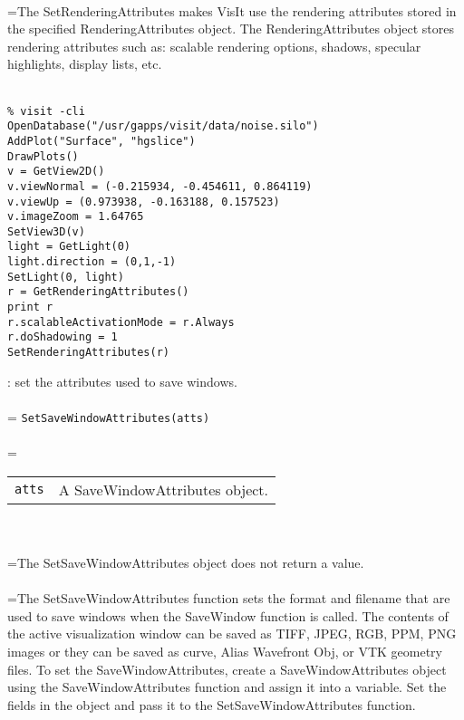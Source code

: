 \documentclass[10pt,a4paper]{report}
\begin{document}
 \\ 
\hangindent=\parindent The SetRenderingAttributes makes VisIt use the rendering attributes stored in the specified RenderingAttributes object. The RenderingAttributes object stores rendering attributes such as: scalable rendering options, shadows, specular highlights, display lists, etc. \\[-3mm] 

\\[-6mm]
\begin{verbatim}% visit -cli
OpenDatabase("/usr/gapps/visit/data/noise.silo")
AddPlot("Surface", "hgslice")
DrawPlots()
v = GetView2D()
v.viewNormal = (-0.215934, -0.454611, 0.864119)
v.viewUp = (0.973938, -0.163188, 0.157523)
v.imageZoom = 1.64765
SetView3D(v)
light = GetLight(0)
light.direction = (0,1,-1)
SetLight(0, light)
r = GetRenderingAttributes()
print r
r.scalableActivationMode = r.Always
r.doShadowing = 1
SetRenderingAttributes(r)
\end{verbatim}
\newpage


{}
: set the attributes used to save windows.\\[-3mm]

 \\ 
\hangindent=\parindent 
\verb!SetSaveWindowAttributes(atts)!\\ [-3mm]

 \\ 
\hangindent=\parindent 
\begin{tabular}{ll}
\verb!atts! & A SaveWindowAttributes object. \\
\end{tabular} \\[-2mm]


 \\ 
\hangindent=\parindent The SetSaveWindowAttributes object does not return a value. \\[-3mm] 

 \\ 
\hangindent=\parindent The SetSaveWindowAttributes function sets the format and filename that are used to save windows when the SaveWindow function is called. The contents of the active visualization window can be saved as TIFF, JPEG, RGB, PPM, PNG images or they can be saved as curve, Alias Wavefront Obj, or VTK geometry files. To set the SaveWindowAttributes, create a SaveWindowAttributes object using the SaveWindowAttributes function and assign it into a variable. Set the fields in the object and pass it to the SetSaveWindowAttributes function. \\[-3mm] 
\end{document}
